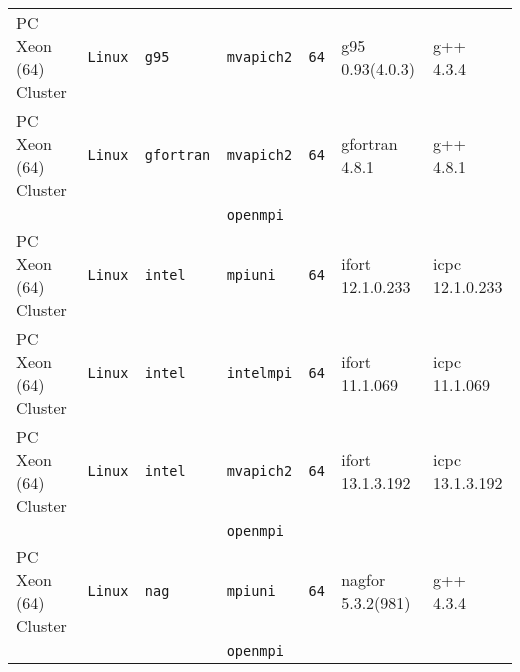 \begin{longtable}{lllllll}
PC Xeon (64) Cluster  &\tt Linux  &\tt g95          &\tt mvapich2   &\tt 64              & g95 \footnotesize 0.93(4.0.3)      & g++ \footnotesize 4.3.4         \\ %
PC Xeon (64) Cluster  &\tt Linux  &\tt gfortran     &\tt mvapich2   &\tt 64              & gfortran \footnotesize 4.8.1       & g++ \footnotesize 4.8.1         \\ %
                      &           &                 &\tt openmpi    &                    &                                    &                                 \\
PC Xeon (64) Cluster  &\tt Linux  &\tt intel        &\tt mpiuni     &\tt 64              & ifort \footnotesize 12.1.0.233     & icpc \footnotesize 12.1.0.233   \\ %
PC Xeon (64) Cluster  &\tt Linux  &\tt intel        &\tt intelmpi   &\tt 64              & ifort \footnotesize 11.1.069       & icpc \footnotesize 11.1.069     \\ %
PC Xeon (64) Cluster  &\tt Linux  &\tt intel        &\tt mvapich2   &\tt 64              & ifort \footnotesize 13.1.3.192     & icpc \footnotesize 13.1.3.192   \\ %
                      &           &                 &\tt openmpi    &                    &                                    &                                 \\
PC Xeon (64) Cluster  &\tt Linux  &\tt nag          &\tt mpiuni     &\tt 64              & nagfor \footnotesize 5.3.2(981)    & g++  \footnotesize 4.3.4        \\ %
                      &           &                 &\tt openmpi    &                    &                                    &                                 \\

\end{longtable}
